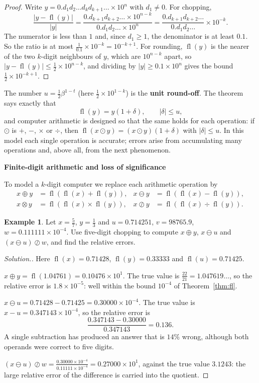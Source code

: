 \documentclass[11pt,a4paper]{article}
\numberwithin{equation}{section}
\DeclareMathOperator{\fl}{fl}
\theoremstyle{definition}
\newtheorem{exa}[thm]{Example}
\newenvironment{solution}
  {\renewcommand{\qedsymbol}{}\begin{proof}[\textit{Solution}.]}
  {\end{proof}}
\newcommand{\subhead}[1]{%
  \par\medskip\noindent\textbf{#1}\par\nobreak\smallskip}
\begin{document}
\begin{proof}
Write $y = 0.d_1d_2\ldots d_kd_{k+1}\ldots\times10^n$ with $d_1\neq0$. For chopping,
$$\frac{|y-\fl(y)|}{|y|} = \frac{0.d_{k+1}d_{k+2}\ldots\times10^{n-k}}{0.d_1d_2\ldots\times10^n} = \frac{0.d_{k+1}d_{k+2}\ldots}{0.d_1d_2\ldots}\times10^{-k}.$$
The numerator is less than $1$ and, since $d_1\geq1$, the denominator is at least $0.1$. So the ratio is at most $\frac{1}{0.1}\times10^{-k}
= 10^{-k+1}$. For rounding, $\fl(y)$ is the nearer of the two $k$-digit neighbours of $y$, which are $10^{n-k}$ apart, so
$|y-\fl(y)|\leq\frac12\times10^{n-k}$, and dividing by $|y|\geq0.1\times10^n$ gives the bound $\frac12\times10^{-k+1}$.
\end{proof}

The number $u = \frac12\beta^{1-t}$ (here $\frac12\times10^{1-k}$) is the \textbf{unit round-off}. The theorem says exactly that
$$\fl(y) = y(1+\delta),\qquad|\delta|\leq u,$$
and computer arithmetic is designed so that the same holds for each operation: if $\odot$ is $+$, $-$, $\times$ or $\div$, then
$\fl(x\odot y) = (x\odot y)(1+\delta)$ with $|\delta|\leq u$. In this model each single operation is accurate; errors arise from
accumulating many operations and, above all, from the next phenomenon.

\subhead{Finite-digit arithmetic and loss of significance}

To model a $k$-digit computer we replace each arithmetic operation by
\begin{align*}
x\oplus y &= \fl(\fl(x)+\fl(y)), & x\ominus y &= \fl(\fl(x)-\fl(y)),\\
x\otimes y &= \fl(\fl(x)\times\fl(y)), & x\oslash y &= \fl(\fl(x)\div\fl(y)).
\end{align*}

\begin{exa}
\label{exa:fivedigit}
Let $x = \frac57$, $y = \frac13$ and $u = 0.714251$, $v = 98765.9$, $w = 0.111111\times10^{-4}$. Use five-digit chopping to compute
$x\oplus y$, $x\ominus u$ and $(x\ominus u)\oslash w$, and find the relative errors.
\end{exa}

\begin{solution}
Here $\fl(x) = 0.71428$, $\fl(y) = 0.33333$ and $\fl(u) = 0.71425$.

$x\oplus y = \fl(1.04761) = 0.10476\times10^1$. The true value is $\frac{22}{21} = 1.047619\ldots$, so the relative error is
$1.8\times10^{-5}$: well within the bound $10^{-4}$ of Theorem~\ref{thm:fl}.

$x\ominus u = 0.71428 - 0.71425 = 0.30000\times10^{-4}$. The true value is $x - u = 0.347143\times10^{-4}$, so the relative error is
$$\frac{0.347143-0.30000}{0.347143} = 0.136 .$$
A single subtraction has produced an answer that is $14\%$ wrong, although both operands were correct to five digits.

$(x\ominus u)\oslash w = \frac{0.30000\times10^{-4}}{0.11111\times10^{-4}} = 0.27000\times10^1$, against the true value $3.1243$: the
large relative error of the difference is carried into the quotient.
\end{solution}
\end{document}
